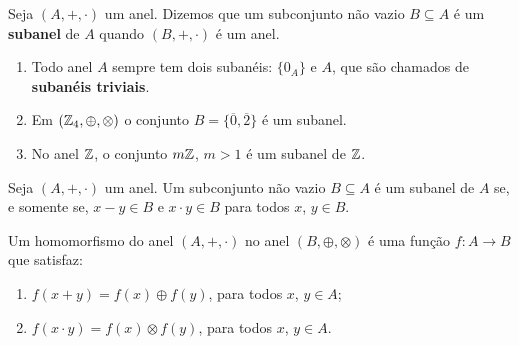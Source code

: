 \begin{definicao}
	Seja $(A, +, \cdot)$ um anel. Dizemos que um subconjunto n{\~a}o vazio $B\subseteq A$ {\'e} um \textbf{subanel} de $A$ quando $(B, +, \cdot)$ \'e um anel.
\end{definicao}

\begin{exemplos}
	\begin{enumerate}[label={\arabic*})]
		\item Todo anel $A$ sempre tem dois suban{\'e}is: $\{0_{A}\}$ e $A$, que s{\~a}o chamados de \textbf{suban{\'e}is triviais}.
		\item Em $(\mathbb{Z}_4,\oplus,\otimes)$ o conjunto $B = \{\overline{0}, \overline{2}\}$ \'e um subanel.
		\item No anel $\mathbb{Z}$, o conjunto $m\mathbb{Z}$, $m > 1$ {\'e} um subanel de $\mathbb{Z}$.
	\end{enumerate}	
\end{exemplos}


\begin{proposicao}
	Seja $(A, +,\cdot)$ um anel. Um subconjunto n{\~a}o vazio $B\subseteq A$ {\'e} um subanel de $A$ se, e somente se, $x - y \in B$ e $x\cdot y \in B$ para todos $x$, $y \in B$.
\end{proposicao}

\begin{definicao}
	Um homomorfismo do anel $(A, +, \cdot)$ no anel $(B, \oplus, \otimes)$ {\'e} uma fun{\c c}{\~a}o $f : A \to B$ que satisfaz:
	\begin{enumerate}[label={\roman*})]
		\item $f(x + y) = f(x) \oplus f(y)$, para todos $x$, $y \in A$;
		\item $f(x \cdot y) = f(x)\otimes f(y)$, para todos $x$, $y \in A$.
	\end{enumerate}
\end{definicao}


